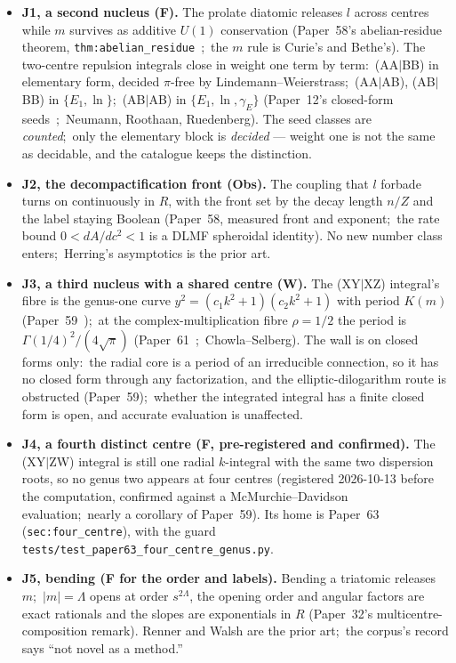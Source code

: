 \documentclass[11pt,a4paper]{article}
\theoremstyle{plain}
\theoremstyle{definition}
\begin{document}
\begin{itemize}
  \item \textbf{J1, a second nucleus (F).} The prolate diatomic releases $l$ across centres while $m$ survives as additive $U(1)$ conservation (Paper~58's abelian-residue theorem, \texttt{thm:abelian\_residue}~\cite{paper58};\ the $m$ rule is Curie's and Bethe's). The two-centre repulsion integrals close in weight one term by term:\ (AA$|$BB) in elementary form, decided $\pi$-free by Lindemann--Weierstrass;\ (AA$|$AB), (AB$|$BB) in $\{E_1, \ln\}$;\ (AB$|$AB) in $\{E_1, \ln, \gamma_E\}$ (Paper~12's closed-form seeds~\cite{paper12};\ Neumann, Roothaan, Ruedenberg). The seed classes are \emph{counted};\ only the elementary block is \emph{decided} --- weight one is not the same as decidable, and the catalogue keeps the distinction.
  \item \textbf{J2, the decompactification front (Obs).} The coupling that $l$ forbade turns on continuously in $R$, with the front set by the decay length $n/Z$ and the label staying Boolean (Paper~58, measured front and exponent;\ the rate bound $0 < dA/dc^2 < 1$ is a DLMF spheroidal identity). No new number class enters;\ Herring's asymptotics is the prior art.
  \item \textbf{J3, a third nucleus with a shared centre (W).} The (XY$|$XZ) integral's fibre is the genus-one curve $y^2 = (c_1k^2+1)(c_2k^2+1)$ with period $K(m)$ (Paper~59~\cite{paper59});\ at the complex-multiplication fibre $\rho = 1/2$ the period is $\Gamma(1/4)^2/(4\sqrt\pi)$ (Paper~61~\cite{paper61};\ Chowla--Selberg). The wall is on closed forms only:\ the radial core is a period of an irreducible connection, so it has no closed form through any factorization, and the elliptic-dilogarithm route is obstructed (Paper~59);\ whether the integrated integral has a finite closed form is open, and accurate evaluation is unaffected.
  \item \textbf{J4, a fourth distinct centre (F, pre-registered and confirmed).} The (XY$|$ZW) integral is still one radial $k$-integral with the same two dispersion roots, so no genus two appears at four centres (registered 2026-10-13 before the computation, confirmed against a McMurchie--Davidson evaluation;\ nearly a corollary of Paper~59). Its home is Paper~63~\cite{paper63} (\texttt{sec:four\_centre}), with the guard \texttt{tests/test\_paper63\_four\_centre\_genus.py}.
  \item \textbf{J5, bending (F for the order and labels).} Bending a triatomic releases $m$;\ $|m| = \Lambda$ opens at order $s^{2\Lambda}$, the opening order and angular factors are exact rationals and the slopes are exponentials in $R$ (Paper~32's multicentre-composition remark). Renner and Walsh are the prior art;\ the corpus's record says ``not novel as a method.''

\end{itemize}
\end{document}

